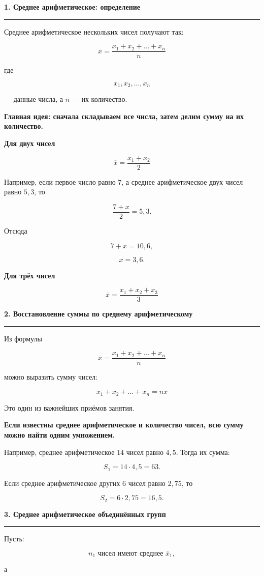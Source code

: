 \documentclass[a4paper,12pt]{article}
\newcommand{\topicsection}[1]{%
    \vspace{0.7em}
    {\Large\bfseries\color{darkaccent}#1}\par
    \vspace{0.15em}
    {\color{accent}\rule{\linewidth}{0.7pt}}
    \vspace{0.35em}
}
\newcommand{\subtopic}[1]{%
    \vspace{0.4em}
    {\large\bfseries\color{darkaccent}#1}\par
}
\newcommand{\important}[1]{%
    \vspace{0.35em}
    \noindent
    \begin{minipage}{\linewidth}
        \color{darkaccent}\bfseries #1
    \end{minipage}
    \vspace{0.25em}
}
\begin{document}
\topicsection{1. Среднее арифметическое: определение}

Среднее арифметическое нескольких чисел получают так:

\[
\boxed{
\overline{x}
=
\frac{x_1+x_2+\dots+x_n}{n}
}
\]

где

\[
x_1,x_2,\dots,x_n
\]

--- данные числа, а \(n\) --- их количество.

\important{Главная идея: сначала складываем все числа, затем делим сумму на их количество.}

\subtopic{Для двух чисел}

\[
\boxed{
\overline{x}=\frac{x_1+x_2}{2}
}
\]

Например, если первое число равно \(7\), а среднее арифметическое двух чисел равно \(5{,}3\), то

\[
\frac{7+x}{2}=5{,}3.
\]

Отсюда

\[
7+x=10{,}6,
\]

\[
\boxed{x=3{,}6}.
\]

\subtopic{Для трёх чисел}

\[
\boxed{
\overline{x}=\frac{x_1+x_2+x_3}{3}
}
\]

\topicsection{2. Восстановление суммы по среднему арифметическому}

Из формулы

\[
\overline{x}
=
\frac{x_1+x_2+\dots+x_n}{n}
\]

можно выразить сумму чисел:

\[
\boxed{
x_1+x_2+\dots+x_n=n\overline{x}
}
\]

Это один из важнейших приёмов занятия.

\important{Если известны среднее арифметическое и количество чисел, всю сумму можно найти одним умножением.}

Например, среднее арифметическое \(14\) чисел равно \(4{,}5\). Тогда их сумма:

\[
S_1=14\cdot4{,}5=63.
\]

Если среднее арифметическое других \(6\) чисел равно \(2{,}75\), то

\[
S_2=6\cdot2{,}75=16{,}5.
\]

\topicsection{3. Среднее арифметическое объединённых групп}

Пусть:

\[
n_1 \text{ чисел имеют среднее } \overline{x}_1,
\]

а
\end{document}

